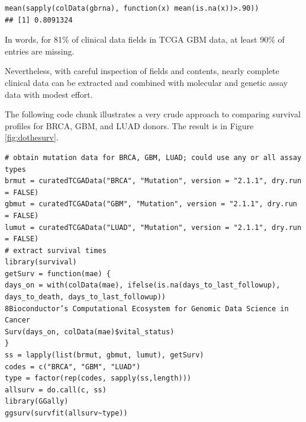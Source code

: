 
\begin{shaded}
\begin{verbatim}
mean(sapply(colData(gbrna), function(x) mean(is.na(x))>.90))
## [1] 0.8091324
\end{verbatim}
\end{shaded}

In words, for 81\% of clinical data fields in TCGA GBM data,
at least 90\% of entries are missing.

Nevertheless, with careful inspection of fields and contents,
nearly complete clinical data can be extracted and combined with molecular
and genetic assay data with modest effort.

The following code chunk illustrates a very crude
approach to comparing survival profiles for BRCA, GBM, and LUAD
donors. The result is in Figure \ref{fig:dothesurv}.


{\small
\begin{shaded}
\begin{verbatim}
# obtain mutation data for BRCA, GBM, LUAD; could use any or all assay types
brmut = curatedTCGAData("BRCA", "Mutation", version = "2.1.1", dry.run = FALSE)
gbmut = curatedTCGAData("GBM", "Mutation", version = "2.1.1", dry.run = FALSE)
lumut = curatedTCGAData("LUAD", "Mutation", version = "2.1.1", dry.run = FALSE)
# extract survival times
library(survival)
getSurv = function(mae) {
days_on = with(colData(mae), ifelse(is.na(days_to_last_followup),
days_to_death, days_to_last_followup))
8Bioconductor’s Computational Ecosystem for Genomic Data Science in Cancer
Surv(days_on, colData(mae)$vital_status)
}
ss = lapply(list(brmut, gbmut, lumut), getSurv)
codes = c("BRCA", "GBM", "LUAD")
type = factor(rep(codes, sapply(ss,length)))
allsurv = do.call(c, ss)
library(GGally)
ggsurv(survfit(allsurv~type))
\end{verbatim}
\end{shaded}
}

